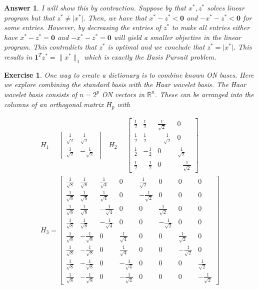 \documentclass[12pt]{article}
\theoremstyle{colon}
\newtheorem{exercise}{Exercise}
\newtheorem*{answer}{Answer}
\begin{document}
\begin{answer}
  I will show this by contraction. Suppose by that $x^*, z^*$ solves linear program but that $z^* \neq \lvert x^* \rvert$. Then, we have that $x^* - z^* < \bm{0}$ and $-x^* - z^* < \bm{0}$ for some entries. However, by decreasing the entries of $z^*$ to make all entries either have $x^* - z^* = \bm{0}$ and $-x^* - z^* = \bm{0}$ will yield a smaller objective in the linear program. This contradicts that $z^*$ is optimal and we conclude that $z^* = \lvert x^* \rvert$. This results in $\bm{1}^T z^* = \lVert x^* \rVert_1$ which is exactly the Basis Pursuit problem.
\end{answer}

\clearpage

\begin{exercise}
  One way to create a dictionary is to combine known ON bases. Here we explore combining the standard basis with the Haar wavelet basis. The Haar wavelet basis consists of $n = 2^p$ ON vectors in $\mathbb{R}^n$. These can be arranged into the columns of an orthogonal matrix $H_p$ with

  \begin{gather*}
    H_1 = \begin{bmatrix}
      \frac{1}{\sqrt{2}} & \frac{1}{\sqrt{2}} \\
      \frac{1}{\sqrt{2}} & -\frac{1}{\sqrt{2}}
    \end{bmatrix} \quad
    H_2 = \begin{bmatrix}
      \frac{1}{2} & \frac{1}{2} & \frac{1}{\sqrt{2}} & 0 \\
      \frac{1}{2} & \frac{1}{2} & -\frac{1}{\sqrt{2}} & 0 \\
      \frac{1}{2} & -\frac{1}{2} & 0 & \frac{1}{\sqrt{2}} \\
      \frac{1}{2} & -\frac{1}{2} & 0 & -\frac{1}{\sqrt{2}}
    \end{bmatrix} \\
    H_3 = \begin{bmatrix}
      \frac{1}{\sqrt{8}} & \frac{1}{\sqrt{8}} & \frac{1}{\sqrt{4}} & 0 & \frac{1}{\sqrt{2}} & 0 & 0 & 0 \\
      \frac{1}{\sqrt{8}} & \frac{1}{\sqrt{8}} & \frac{1}{\sqrt{4}} & 0 & -\frac{1}{\sqrt{2}} & 0 & 0 & 0 \\
      \frac{1}{\sqrt{8}} & \frac{1}{\sqrt{8}} & -\frac{1}{\sqrt{4}} & 0 & 0 & \frac{1}{\sqrt{2}} & 0 & 0 \\
      \frac{1}{\sqrt{8}} & \frac{1}{\sqrt{8}} & -\frac{1}{\sqrt{4}} & 0 & 0 & -\frac{1}{\sqrt{2}} & 0 & 0 \\
      \frac{1}{\sqrt{8}} & -\frac{1}{\sqrt{8}} & 0 & \frac{1}{\sqrt{4}} & 0 & 0 & \frac{1}{\sqrt{2}} & 0 \\
      \frac{1}{\sqrt{8}} & -\frac{1}{\sqrt{8}} & 0 & \frac{1}{\sqrt{4}} & 0 & 0 & -\frac{1}{\sqrt{2}} & 0 \\
      \frac{1}{\sqrt{8}} & -\frac{1}{\sqrt{8}} & 0 & -\frac{1}{\sqrt{4}} & 0 & 0 & 0 & \frac{1}{\sqrt{2}} \\
      \frac{1}{\sqrt{8}} & -\frac{1}{\sqrt{8}} & 0 & -\frac{1}{\sqrt{4}} & 0 & 0 & 0 & -\frac{1}{\sqrt{2}}
    \end{bmatrix}
  \end{gather*}


\end{exercise}
\end{document}
